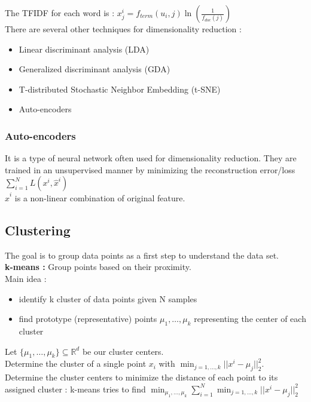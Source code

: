 \documentclass[../main.tex]{subfiles}
\begin{document}
The TFIDF for each word is : $x_j^i = f_{term}(u_i,j) \ln(\frac{1}{f_{doc}(j)})$\\

There are several other techniques for dimensionality reduction : \begin{itemize}
    \item Linear discriminant analysis (LDA)\\
    \item Generalized discriminant analysis (GDA)\\
    \item T-distributed Stochastic Neighbor Embedding (t-SNE)\\
    \item Auto-encoders\\
\end{itemize}

\subsubsection{Auto-encoders}
It is a type of neural network often used for dimensionality reduction. They are trained in an unsupervised manner by minimizing the reconstruction error/loss $\sum_{i=1}^NL(x^i,\hat{x}^i)$\\
$\hat{x}^i$ is a non-linear combination of original feature.\\

\subsection{Clustering}

The goal is to group data points as a first step to understand the data set.\\
\textbf{k-means :} Group points based on their proximity.\\

Main idea : \begin{itemize}
    \item identify k cluster of data points given N samples\\
    \item find prototype (representative) points $\mu_1, \dots, \mu_k$ representing the center of each cluster\\
\end{itemize}

Let $\{\mu_1,\dots, \mu_k\} \subseteq \mathbb{R}^d$ be our cluster centers.\\
Determine the cluster of a single point $x_i$ with $\min_{j=1,\dots, k} \lvert \lvert x^i-\mu_j \rvert \rvert_2^2$.\\
Determine the cluster centers to minimize the distance of each point to its assigned cluster : k-means tries to find $\min_{\mu_1,\dots, \mu_k} \sum_{i=1}^N \min_{j=1,\dots,k} \lvert \lvert x^i-\mu_j\rvert\rvert_2^2$\\
\end{document}
